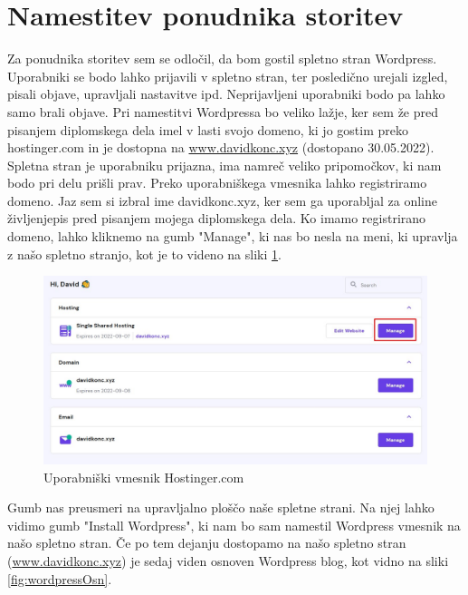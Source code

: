 \documentclass[a4paper,12pt,openright]{book}
\begin{document}
{\section{Namestitev ponudnika storitev}

Za ponudnika storitev sem se odločil, da bom gostil spletno stran Wordpress. Uporabniki se bodo lahko prijavili v spletno stran, ter posledično urejali izgled, pisali objave, upravljali nastavitve ipd. 
Neprijavljeni uporabniki bodo pa lahko samo brali objave. 
\newline
Pri namestitvi Wordpressa bo veliko lažje, ker sem že pred pisanjem diplomskega dela imel v lasti svojo domeno, ki jo gostim preko hostinger.com in je dostopna na \href{www.davidkonc.xyz}{www.davidkonc.xyz} (dostopano 30.05.2022). 
\newline
Spletna stran je uporabniku prijazna, ima namreč veliko pripomočkov, ki nam bodo pri delu prišli prav.
Preko uporabniškega vmesnika lahko registriramo domeno. Jaz sem si izbral ime davidkonc.xyz, ker sem ga uporabljal za online življenjepis pred pisanjem mojega diplomskega dela. 
\newline
Ko imamo registrirano domeno, lahko kliknemo na gumb "Manage", ki nas bo nesla na meni, ki upravlja z našo spletno stranjo, kot je to videno na sliki \ref{fig:hostinger}.

\begin{figure}[H]
\hspace{-3,5cm}
\includegraphics[scale=0.65]{diploma-FRI-vzorec_11maj2021/hostinger.jpg}
\caption{Uporabniški vmesnik Hostinger.com}
\label{fig:hostinger}
\end{figure}


Gumb nas preusmeri na upravljalno ploščo naše spletne strani. Na njej lahko vidimo gumb "Install Wordpress", ki nam bo sam namestil Wordpress vmesnik na našo spletno stran. Če po tem dejanju dostopamo na našo spletno stran (\href{www.davidkonc.xyz}{www.davidkonc.xyz}) je sedaj viden osnoven Wordpress blog, kot vidno na sliki \ref{fig:wordpressOsn}.

}
\end{document}
